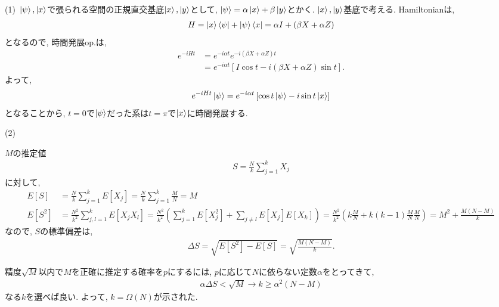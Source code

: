 \begin{ex}
    \label{ex6.12}
    (1)\
    $\ket{\psi}, \ket{x}$で張られる空間の正規直交基底$\ket{x}, \ket{y}$として,
    $\ket{\psi} = \alpha \ket{x} + \beta \ket{y}$とかく. $\ket{x}, \ket{y}$基底で考える.
    Hamiltonianは,
    \begin{align*}
        H = \ket{x}\bra{\psi} + \ket{\psi} \bra{x}
        =
        \alpha I + (\beta X + \alpha Z)
    \end{align*}
    となるので, 時間発展op.は,
    \begin{align*}
        e^{- i H t}
         & =e^{- i \alpha t}e^{- i (\beta X + \alpha Z) t}                            \\
         & = e^{- i \alpha t} \left[ I \cos t - i (\beta X + \alpha Z) \sin t\right].
    \end{align*}
    よって,
    \begin{align*}
        e^{- i H t} \ket{ \psi}
        =
        e^{- i \alpha t} \left[ \cos t \ket{\psi} - i  \sin t \ket{x}\right]
    \end{align*}
    となることから, $t = 0$で$\ket{\psi}$だった系は$t = \pi$で$\ket{x}$に時間発展する.
    \par
    (2)\
\end{ex}

\begin{ex}
    \label{ex6.13}
    $M$の推定値
    \begin{align*}
        S = \frac{N}{k} \sum_{j=1}^k X_j
    \end{align*}
    に対して,
    \begin{align*}
        E[S]   & = \frac{N}{k}\sum_{j=1}^k E[X_j] = \frac{N}{k}\sum_{j=1}^k \frac{M}{N} = M \\
        E[S^2] & = \frac{N^2}{k^2} \sum_{j, l=1}^k E[ X_j X_l]
        =\frac{N^2}{k^2}\left( \sum_{j=1}^k E[ X_j^2] +  \sum_{j\neq l} E[X_j] E[X_k]\right)
        =\frac{N^2}{k^2} \left( k \frac{M}{N} + k(k-1) \frac{M}{N} \frac{M}{N}\right)
        = M^2 + \frac{M(N-M)}{k}
    \end{align*}
    なので, $S$の標準偏差は,
    \begin{align*}
        \Delta S = \sqrt{E[S^2] - E[S] } = \sqrt{\frac{M(N-M)}{k}}.
    \end{align*}
    \par
    精度$\sqrt{M}$以内で$M$を正確に推定する確率を$p$にするには, $p$に応じて$N$に依らない定数$\alpha$をとってきて,
    \begin{align*}
        \alpha \Delta S < \sqrt{M} \to k \geq \alpha^2(N-M)
    \end{align*}
    なる$k$を選べば良い. よって, $k = \Omega({N})$が示された.
\end{ex}

